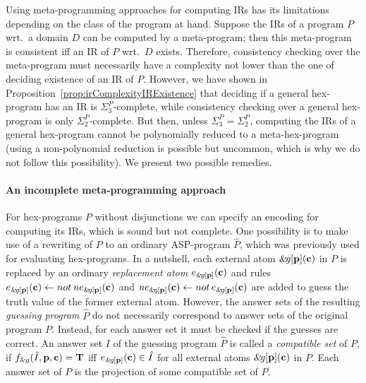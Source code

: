\documentclass[11pt,fleqn,twoside]{article}
\renewcommand{\vec}[1]{\ensuremath{\mb{#1}}}
\newcommand{\mb}[1]{\ensuremath{\mathbf{#1}}}
\def\naf{\ensuremath{\mathop{not}}}
\newcommand\hex{{\sc hex}\xspace}
\newcommand{\amp}[1]{\ensuremath{\text{\textsl{{\&}}}\!\mathit{#1}}}
\newcommand{\ext}[3]{\ensuremath{\amp{#1}[#2](#3)}}
\newcommand{\extsem}[4]{\ensuremath{f_{\text{\sl\&}#1}(#2,#3,#4)}}
\newcommand{\T}{\mathbf{T}}
\begin{document}
			Using meta-programming approaches for computing IRs has its limitations depending on the class of the program at hand.
			Suppose the IRs of a program $P$ wrt.~a domain $D$ can be computed by a meta-program;
			then this meta-program is consistent iff an IR of $P$ wrt.~$D$ exists. Therefore, consistency checking over the meta-program must necessarily have a complexity not lower than
			the one of deciding existence of an IR of $P$.
			However, we have shown in Proposition~\ref{prop:irComplexityIRExistence} that deciding if a general \hex-program
			has an IR is $\Sigma^P_3$-complete, while consistency checking over a general \hex-program is only $\Sigma^P_2$-complete.
			But then, unless $\Sigma^P_3 = \Sigma^P_2$, computing the IRs of a general \hex-program cannot be polynomially reduced to a meta-\hex-program
			(using a non-polynomial reduction is possible but uncommon, which is why we do not follow this possibility).
			We present two possible remedies.

			\paragraph{An incomplete meta-programming approach}

				For \hex-programs $P$ without disjunctions we can specify an encoding for computing its IRs, which is sound but not complete.
				One possibility is to make use of a rewriting of $P$ to an ordinary ASP-program $\hat{P}$, which was previously used for evaluating \hex-programs.
				In a nutshell, each external atom $\ext{g}{\vec{p}}{\vec{c}}$ in $P$ is replaced by an ordinary \emph{replacement atom} $e_{\amp{g}[\vec{p}]}(\vec{c})$
				and rules $e_{\amp{g}[\vec{p}]}(\vec{c}) \leftarrow \naf \mathit{ne}_{\amp{g}[\vec{p}]}(\vec{c})$ and $\mathit{ne}_{\amp{g}[\vec{p}]}(\vec{c}) \leftarrow \naf e_{\amp{g}[\vec{p}]}(\vec{c})$
				are added to guess the truth value of the former external atom.
				However, the answer sets of the resulting \emph{guessing program} $\hat{P}$
				do not necessarily correspond to answer sets of the original program $P$.
				Instead, for each answer set it must be checked if the guesses are correct.
				An answer set $I$ of the guessing program $\hat{P}$
				is called a \emph{compatible set} of $P$, if $\extsem{g}{\hat{I}}{\vec{p}}{\vec{c}} = \T$ iff
				$e_{\amp{g}[\vec{p}]}(\vec{c}) \in \hat{I}$ for
				all external atoms $\amp{g}[\vec{p}](\vec{c})$ in $P$.
				Each answer set of $P$ is the projection of some compatible set of $P$.
\end{document}
